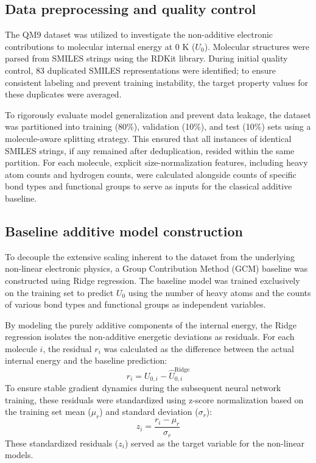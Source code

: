 \documentclass[]{article}
\begin{document}
\subsection{Data preprocessing and quality control}
The QM9 dataset was utilized to investigate the non-additive electronic contributions to molecular internal energy at 0 K ($U_0$). Molecular structures were parsed from SMILES strings using the RDKit library. During initial quality control, 83 duplicated SMILES representations were identified; to ensure consistent labeling and prevent training instability, the target property values for these duplicates were averaged. 

To rigorously evaluate model generalization and prevent data leakage, the dataset was partitioned into training (80\%), validation (10\%), and test (10\%) sets using a molecule-aware splitting strategy. This ensured that all instances of identical SMILES strings, if any remained after deduplication, resided within the same partition. For each molecule, explicit size-normalization features, including heavy atom counts and hydrogen counts, were calculated alongside counts of specific bond types and functional groups to serve as inputs for the classical additive baseline.

\subsection{Baseline additive model construction}
To decouple the extensive scaling inherent to the dataset from the underlying non-linear electronic physics, a Group Contribution Method (GCM) baseline was constructed using Ridge regression. The baseline model was trained exclusively on the training set to predict $U_0$ using the number of heavy atoms and the counts of various bond types and functional groups as independent variables. 

By modeling the purely additive components of the internal energy, the Ridge regression isolates the non-additive energetic deviations as residuals. For each molecule $i$, the residual $r_i$ was calculated as the difference between the actual internal energy and the baseline prediction:
\begin{equation}
    r_i = U_{0,i} - \hat{U}_{0,i}^{\text{Ridge}}
\end{equation}
To ensure stable gradient dynamics during the subsequent neural network training, these residuals were standardized using z-score normalization based on the training set mean ($\mu_r$) and standard deviation ($\sigma_r$):
\begin{equation}
    z_i = \frac{r_i - \mu_r}{\sigma_r}
\end{equation}
These standardized residuals ($z_i$) served as the target variable for the non-linear models.
\end{document}
